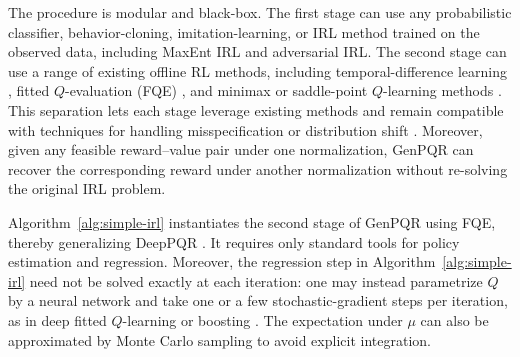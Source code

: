 \documentclass{article}
\newcommand{\1}{\mathbbm{1}}
\begin{document}
The procedure is modular and black-box. The first stage can use any
probabilistic classifier, behavior-cloning, imitation-learning, or IRL method
trained on the observed data, including MaxEnt IRL and adversarial IRL. The
second stage can use a range of existing offline RL methods, including
temporal-difference learning \citep{tsitsiklis1996analysis}, fitted
\(Q\)-evaluation (FQE) \citep{munos2008finite,van2025fitted}, and minimax or
saddle-point \(Q\)-learning methods
\citep{uehara2020minimax,imaizumi2021minimax,xie2020q,xie2021batch}. This
separation lets each stage leverage existing methods and remain compatible with
techniques for handling misspecification or distribution shift
\citep{fujimoto2019off,agarwal2021deep,chen2019information,foster2021offline}.
Moreover, given any feasible reward--value pair under one normalization,
GenPQR can recover the corresponding reward under another normalization without
re-solving the original IRL problem.

Algorithm~\ref{alg:simple-irl} instantiates the second stage of GenPQR using
FQE, thereby generalizing DeepPQR \citep{geng2020deep}. It requires only
standard tools for policy estimation and regression. Moreover, the regression
step in Algorithm~\ref{alg:simple-irl} need not be solved exactly at each
iteration: one may instead parametrize \(Q\) by a neural network and take one
or a few stochastic-gradient steps per iteration, as in deep fitted
\(Q\)-learning or boosting \citep{tosatto2017boosted}. The expectation under
\(\mu\) can also be approximated by Monte Carlo sampling to avoid explicit
integration.
\end{document}
